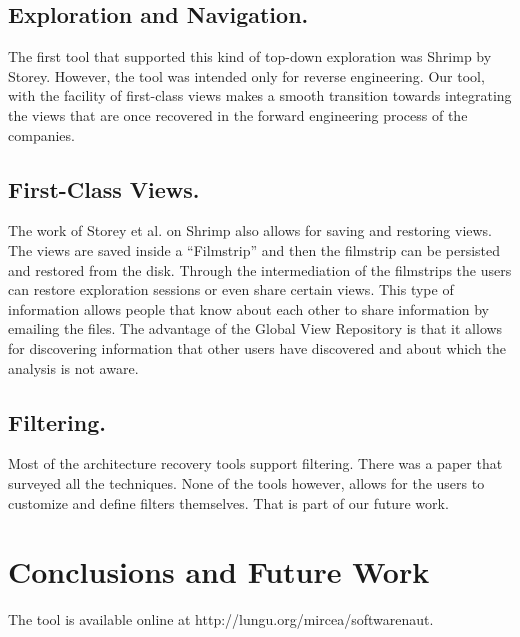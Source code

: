 \documentclass[preprint,12pt]{elsarticle}
\begin{document}
\subsection {Exploration and Navigation.} The first tool that supported this kind of top-down exploration was Shrimp by Storey. However, the tool was intended only for reverse engineering. Our tool, with the facility of first-class views makes a smooth transition towards integrating the views that are once recovered in the forward engineering process of the companies.

\subsection {First-Class Views.} The work of Storey et al. on Shrimp also allows for saving and restoring views. The views are saved inside a “Filmstrip” and then the filmstrip can be persisted and restored from the disk. Through the intermediation of the filmstrips the users can restore exploration sessions or even share certain views. This type of information allows people that know about each other to share information by emailing the files. The advantage of the Global View Repository is that it allows for discovering information that other users have discovered and about which the analysis is not aware. 

\subsection {Filtering.} Most of the architecture recovery tools support filtering. There was a paper that surveyed all the techniques. None of the tools however, allows for the users to customize and define filters themselves. That is part of our future work. 


\section {Conclusions and Future Work}
The tool is available online at http://lungu.org/mircea/softwarenaut.











\end{document}
